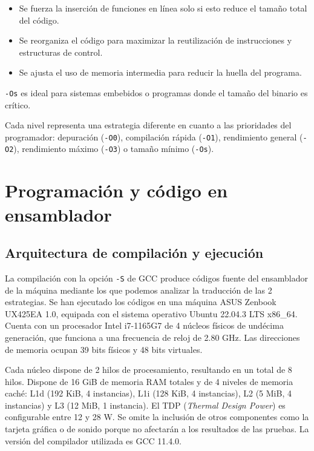 \documentclass[11pt,a4paper,twoside]{article}
\theoremstyle{definition}
\begin{document}
	\begin{itemize}
		\item Se fuerza la inserción de funciones en línea solo si esto reduce el tamaño total del código.
		\item Se reorganiza el código para maximizar la reutilización de instrucciones y estructuras de control.
		\item Se ajusta el uso de memoria intermedia para reducir la huella del programa.
	\end{itemize}

	\texttt{-Os} es ideal para sistemas embebidos o programas donde el tamaño del binario es crítico.
	
	Cada nivel representa una estrategia diferente en cuanto a las prioridades del programador: depuración (\texttt{-O0}), compilación rápida (\texttt{-O1}), rendimiento general (\texttt{-O2}), rendimiento máximo (\texttt{-O3}) o tamaño mínimo (\texttt{-Os}).
	
	\section{Programación y código en ensamblador}
	
	\subsection{Arquitectura de compilación y ejecución}
	
	La compilación con la opción \texttt{-S} de GCC produce códigos fuente del ensamblador de la máquina mediante los que podemos analizar la traducción de las 2 estrategias. Se han ejecutado los códigos en una máquina ASUS Zenbook UX425EA 1.0, equipada con el sistema operativo Ubuntu 22.04.3 LTS x86\_64. Cuenta con un procesador Intel i7-1165G7 de 4 núcleos físicos de undécima generación, que funciona a una frecuencia de reloj de 2.80 GHz. Las direcciones de memoria ocupan 39 bits físicos y 48 bits virtuales.
	
	Cada núcleo dispone de 2 hilos de procesamiento, resultando en un total de 8 hilos. Dispone de 16 GiB de memoria RAM totales y de 4 niveles de memoria caché: L1d (192 KiB, 4 instancias), L1i (128 KiB, 4 instancias), L2 (5 MiB, 4 instancias) y L3 (12 MiB, 1 instancia). El TDP (\textit{Thermal Design Power}) es configurable entre 12 y 28 W. Se omite la inclusión de otros componentes como la tarjeta gráfica o de sonido porque no afectarán a los resultados de las pruebas. La versión del compilador utilizada es GCC 11.4.0.
\end{document}
